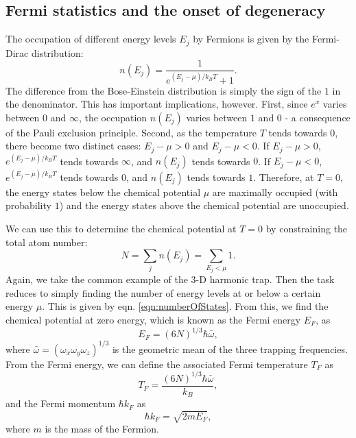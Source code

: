 \subsection{Fermi statistics and the onset of degeneracy}
The occupation of different energy levels $E_j$ by Fermions is given by the Fermi-Dirac distribution:
\begin{equation}
n(E_j)= \frac{1}{e^{(E_j-\mu)/k_BT}+1}.
\end{equation}
The difference from the Bose-Einstein distribution is simply the sign of the $1$ in the denominator. This has important implications, however. First, since $e^x$ varies between $0$ and $\infty$, the occupation $n(E_j)$ varies between $1$ and $0$ - a consequence of the Pauli exclusion principle. Second, as the temperature $T$ tends towards $0$, there become two distinct cases: $E_j-\mu>0$ and $E_j-\mu<0$. If $E_j-\mu>0$, $e^{(E_j-\mu)/k_BT}$ tends towards $\infty$, and $n(E_j)$ tends towards $0$. If  $E_j-\mu<0$, $e^{(E_j-\mu)/k_BT}$ tends towards $0$, and $n(E_j)$ tends towards $1$. Therefore, at $T=0$, the energy states below the chemical potential $\mu$ are maximally occupied (with probability $1$) and the energy states above the chemical potential are unoccupied. 

We can use this to determine the chemical potential at $T=0$ by constraining the total atom number:
\begin{equation}
N=\sum_j n(E_j) = \sum_{E_j<\mu} 1.
\end{equation}
Again, we take the common example of the 3-D harmonic trap. Then the task reduces to simply finding the number of energy levels at or below a certain energy $\mu$. This is given by eqn. \ref{eqn:numberOfStates}. From this, we find the chemical potential at zero energy, which is known as the Fermi energy $E_F$, as
\begin{equation}
E_F = (6 N)^{1/3}\hbar\bar{\omega},
\end{equation}
where $\bar{\omega}=(\omega_x\omega_y\omega_z)^{1/3}$ is the geometric mean of the three trapping frequencies. From the Fermi energy, we can define the associated Fermi temperature $T_F$ as
\begin{equation}
T_F = \frac{(6 N)^{1/3}\hbar\bar{\omega}}{k_B},
\end{equation}
and the Fermi momentum $\hbar k_F$ as
\begin{equation}
\hbar k_F = \sqrt{2 m E_F},
\end{equation}
where $m$ is the mass of the Fermion. 


